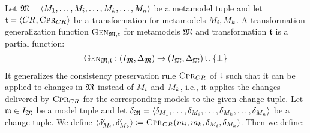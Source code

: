 \begin{definition}
    \label{def:generalizationfunction}
    Let $\metamodeltuple{M} = \tupled{\metamodel{M}{1}, \dots, \metamodel{M}{i}, \dots, \metamodel{M}{k}, \dots, \metamodel{M}{n}}$ be a metamodel tuple and let $\transformation{t} = \tupled{\consistencyrelation{CR}{}, \consistencypreservationrule{\consistencyrelation{CR}{}}}$ be a transformation for metamodels $\metamodel{M}{i}, \metamodel{M}{k}$.
    A transformation generalization function $\generalizationfunction{\metamodeltuple{M},\transformation{t}}$ for metamodels $\metamodeltuple{M}$ and transformation $\transformation{t}$ is a partial function:
    \begin{align*}
        \generalizationfunction{\metamodeltuple{M},\transformation{t}} : (\metamodeltupleinstanceset{M}, \changeuniverse{\metamodeltuple{M}}) \rightarrow (\metamodeltupleinstanceset{M}, \changeuniverse{\metamodeltuple{M}}) \cup \setted{\bot}
    \end{align*}
    It generalizes the consistency preservation rule $\consistencypreservationrule{\consistencyrelation{CR}{}}$ of $\transformation{t}$ such that it can be applied to changes in $\metamodeltuple{M}$ instead of $\metamodel{M}{i}$ and $\metamodel{M}{k}$, i.e., it applies the changes delivered by $\consistencypreservationrule{\consistencyrelation{CR}{}}$ for the corresponding models to the given change tuple.
    Let $\modeltuple{m} \in \metamodeltupleinstanceset{M}$ be a model tuple and let $\changetuple{\metamodeltuple{M}} = \tupled{\change{\metamodel{M}{1}}, \dots, \change{\metamodel{M}{i}}, \dots, \change{\metamodel{M}{k}}, \dots, \change{\metamodel{M}{n}}}$ be a change tuple.
    We define $\tupled{\change{\metamodel{M}{i}}', \change{\metamodel{M}{k}}'} \equalsperdefinition \consistencypreservationrule{\consistencyrelation{CR}{}}(\model{m}{i}, \model{m}{k}, \change{\metamodel{M}{i}}, \change{\metamodel{M}{k}})$.
    Then we define:
\end{definition}

